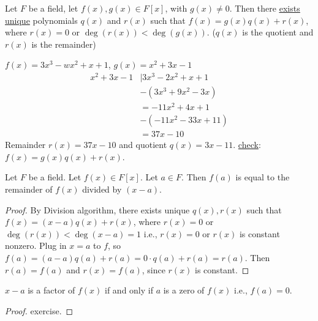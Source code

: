 \documentclass[]{article}
\begin{document}
\begin{theorem}
	Let $F$ be a field, let $f(x),g(x)\in F[x]$, with $g(x)\neq0$.
	Then there \ul{\ul{exists}} \ul{unique} polynomials $q(x)$ and $r(x)$ such that $f(x)=g(x)q(x)+r(x)$, where $r(x)=0$ or $\deg(r(x))<\deg(g(x))$. ($q(x)$ is the quotient and $r(x)$ is the remainder)
\end{theorem}
\begin{example}
	$f(x)=3x^3-wx^2+x+1$, $g(x)=x^2+3x-1$
	\begin{align*}
		x^2 + 3x - 1 &\mid 3x^3-2x^2+x+1 \\
					 &- (3x^3+9x^2-3x) \\
					 &= -11x^2+4x+1 \\
					 &- (-11x^2-33x+11) \\
					 &= 37x-10
	\end{align*}
	Remainder $r(x)=37x-10$ and quotient $q(x)=3x-11$.
	\ul{check}: $f(x)=g(x)q(x)+r(x)$.
\end{example}
\begin{corollary}
	 Let $F$ be a field. Let $f(x)\in F[x]$. Let $a\in F$.
	Then $f(a)$ is equal to the remainder of $f(x)$ divided by $(x-a)$.
\end{corollary}
\begin{proof}
	By Division algorithm, there exists unique $q(x),r(x)$ such that $f(x)=(x-a)q(x)+r(x)$, where $r(x)=0$ or $\deg(r(x))<\deg(x-a)=1$ i.e., $r(x)=0$ or $r(x)$ is constant nonzero.
	Plug in $x=a$ to $f$, so $f(a)=(a-a)q(a)+r(a)=0\cdot q(a)+r(a)=r(a)$.
	Then $r(a)=f(a)$ and $r(x)=f(a)$, since $r(x)$ is constant.
\end{proof}
\begin{corollary}
	 $x-a$ is a factor of $f(x)$ if and only if $a$ is a zero of $f(x)$ i.e., $f(a)=0$.
\end{corollary}
\begin{proof}
	exercise.
\end{proof}
\end{document}

